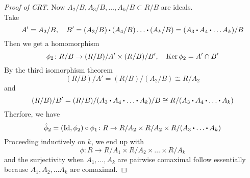 \documentclass[../Main.tex]{subfiles}
\begin{document}
\begin{proof}[Proof of CRT]
	Now $A_2/B,A_3/B,\dots,A_k/B\subset R/B$ are ideals.\\
	Take 
	\[A'=A_2/B,\quad B' = (A_3/B)\rdot (A_4/B)\dots \rdot (A_k/B) = (A_3\rdot A_4\rdot \dots A_k)/B\]
	Then we get a homomorphism
	\[\phi_2\colon R/B\to (R/B)/A' \times (R/B)/B', \quad \operatorname{Ker} \phi_2 = A'\cap B'\]
	By the third isomorphism theorem 
	\[(R/B)/A'=(R/B)/(A_2/B)\cong R/A_2\]
	and
	\[(R/B)/B'=(R/B)/(A_3\rdot A_4\rdot \dots \rdot A_k)/B\cong R/(A_3\rdot A_4\rdot \dots \rdot A_k)\]
	Therfore, we have 
	\[\hat{\phi}_2=(\mathrm{Id},\phi_2)\circ \phi_1\colon R\to R/A_2\times R/A_2\times R/(A_3\rdot \dots\rdot A_k) \]
	Proceeding inductively on $k$, we end up with
	\[\phi\colon R\to R/A_1\times R/A_2\times \dots \times R/A_k\]
	and the surjectivity when $A_1,\dots,A_k$ are pairwise comaximal follow essentially because $A_1,A_2,\dots A_k$ are comaximal.
\end{proof}
\end{document}
